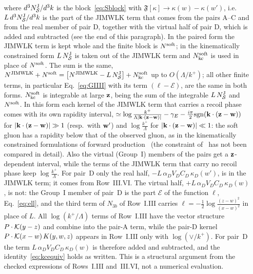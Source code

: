 where $d^3N^{\rm J}_{\mathcal S}/d^3k$ is the block~\eqref{eq:Sblock} with $\mathfrak F[\kappa]\to\kappa(w)-\kappa(w')$, i.e.\ $L\,d^3N^{\rm J}_{\mathcal S}/d^3k$ is the part of the JIMWLK term that comes from the pairs A--C and from the real member of pair D, together with the virtual half of pair D, which is added and subtracted (see the end of this paragraph). In the paired form the JIMWLK term is kept whole and the finite block is $N^{\rm soft}$; in the kinematically constrained form $L\,N^{\rm J}_{\mathcal S}$ is taken out of the JIMWLK term and $N^{\rm soft}_{\rm kc}$ is used in place of $N^{\rm soft}$. The sum is the same, $N^{\rm JIMWLK}+N^{\rm soft}=\big[N^{\rm JIMWLK}-L\,N^{\rm J}_{\mathcal S}\big]+N^{\rm soft}_{\rm kc}$ up to $O(\Lambda/k^+)$; all other finite terms, in particular Eq.~\eqref{eq:GIIII} with its term $(\ell-\mathcal E)$, are the same in both forms. $N^{\rm soft}_{\rm kc}$ is integrable at large $\mathbf{z}$, being the sum of the integrable $L\,N^{\rm J}_{\mathcal S}$ and $N^{\rm soft}$. In this form each kernel of the JIMWLK term that carries a recoil phase comes with its own rapidity interval, $\simeq\log\frac{k^+}{\Lambda|\mathbf{k}\cdot(\mathbf{z}-\mathbf{w})|}-\gamma_E-\frac{i\pi}{2}{\rm sgn}(\mathbf{k}\cdot(\mathbf{z}-\mathbf{w}))$ for $|\mathbf{k}\cdot(\mathbf{z}-\mathbf{w})|\gg1$ (resp.\ with $\mathbf{w}'$) and $\log\frac{k^+}{\Lambda}$ for $|\mathbf{k}\cdot(\mathbf{z}-\mathbf{w})|\ll1$: the soft gluon has a rapidity below that of the observed gluon, as in the kinematically constrained formulations of forward production~\cite{Altinoluk:2014eka,Ducloue:2016shw} (the constraint of~\cite{Ducloue:2016shw} has not been compared in detail). Also the virtual (Group~I) members of the pairs get a $\mathbf{z}$-dependent interval, while the terms of the JIMWLK term that carry no recoil phase keep $\log\frac{k^+}{\Lambda}$. For pair~D only the real half, $-L\,\alpha_DV_DC_D\,\kappa_D(w')$, is in the JIMWLK term; it comes from Row~III.VI. The virtual half, $+L\,\alpha_DV_DC_D\,\kappa_D(w)$, is not: the Group~I member of pair~D is the part $\mathcal E$ of the function $\ell$, Eq.~\eqref{eq:ell}, and the third term of $N_{3b}$ of Row~I.III carries $\ell=-\frac12\log\frac{(z-w)^2}{(x-w)^2}$ in place of $L$. All $\log(k^+/\Lambda)$ terms of Row~I.III have the vector structure $P\cdot\mathcal{K}(y-z)$ and combine into the pair-A term, while the pair-D kernel $P\cdot\mathcal{K}(x-w)\,K(y,w,z)$ appears in Row~I.III only with $\log(\vee/k^+)$. For pair~D the term $L\,\alpha_DV_DC_D\,\kappa_D(w)$ is therefore added and subtracted, and the identity~\eqref{eq:kcequiv} holds as written. This is a structural argument from the checked expressions of Rows~I.III and~III.VI, not a numerical evaluation.

